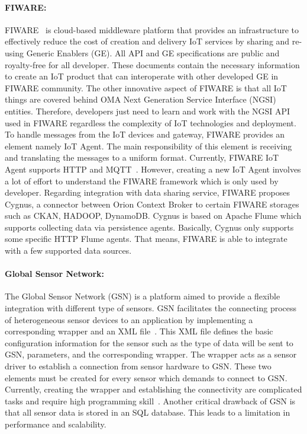 \paragraph{FIWARE:}
    FIWARE~\cite{zahariadis2014fiware} is cloud-based middleware platform that provides an infrastructure to effectively reduce the cost of creation and delivery IoT services by sharing and re-using Generic Enablers (GE). All API and GE specifications are public and royalty-free for all developer. These documents contain the necessary information to create an IoT product that can interoperate with other developed GE in FIWARE community. The other innovative aspect of FIWARE is that all IoT things are covered behind OMA Next Generation Service Interface (NGSI) entities. Therefore, developers just need to learn and work with the NGSI API used in FIWARE regardless the complexity of IoT technologies and deployment. To handle messages from the IoT devices and gateway, FIWARE provides an element namely IoT Agent. The main responsibility of this element is receiving and translating the messages to a uniform format. Currently, FIWARE IoT Agent supports HTTP and MQTT~\cite{iota-fiware-iot-stack}. However, creating a new IoT Agent involves a lot of effort to understand the FIWARE framework  which is only used by developer. Regarding integration with data sharing service, FIWARE proposes Cygnus, a connector between Orion Context Broker to certain FIWARE storages such as CKAN, HADOOP, DynamoDB. Cygnus is based on Apache Flume  which supports collecting data via persistence agents. Basically, Cygnus only supports some specific HTTP Flume agents. That means, FIWARE is able to integrate with a few supported data sources.
    
\paragraph{Global Sensor Network:}
The Global Sensor Network (GSN) is a platform aimed to provide a flexible integration with different type of sensors. GSN facilitates the connecting process of heterogeneous sensor devices to an application by implementing a corresponding wrapper and an XML file~\cite{Aberer2006}. This XML file defines the basic configuration information for the sensor such as the type of data will be sent to GSN, parameters, and the corresponding wrapper. The wrapper acts as a sensor driver to establish a connection from sensor hardware to GSN. These two elements must be created for every sensor which demands to connect to GSN. Currently, creating the wrapper and establishing the connectivity are complicated tasks and require high programming skill~\cite{gsn_2013}. Another critical drawback of GSN is that all sensor data is stored in an SQL database. This leads to a limitation in performance and scalability.

